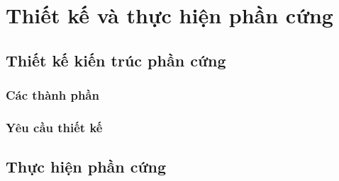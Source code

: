 \headerandfooterconfig

\chapter{Thiết kế và thực hiện phần cứng}
\section{Thiết kế kiến trúc phần cứng}
\subsection{Các thành phần}
\subsection{Yêu cầu thiết kế}

\section{Thực hiện phần cứng}